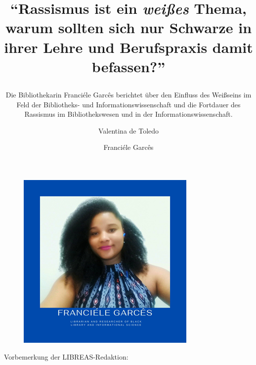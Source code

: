 \documentclass[a4paper,
fontsize=11pt,
oneside,
numbers=noperiodatend,
parskip=half-,
bibliography=totoc,
final
]{scrartcl}
\title{\LARGE{\enquote{Rassismus ist ein \textit{weißes} Thema, warum sollten sich nur Schwarze in ihrer Lehre und Berufspraxis damit befassen?}}%
\subtitle{Die Bibliothekarin Franciéle Garcês berichtet über den Einfluss des Weißseins im Feld der Bibliotheks- und Informationswissenschaft und die Fortdauer des Rassismus im Bibliothekswesen und in der Informationswissenschaft.}}
\author{Valentina de Toledo \and Franciéle Garcês} %
\date{}
\begin{document}
\maketitle
\thispagestyle{fancyplain} 


\begin{figure}[h!]
\centering
\includegraphics{img/img1.PNG}
\end{figure}

Vorbemerkung der LIBREAS-Redaktion:
\end{document}
